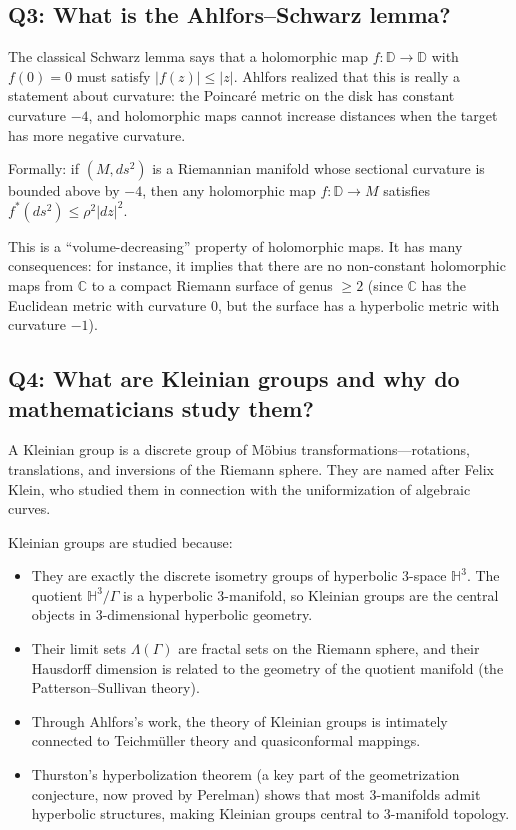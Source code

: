 \subsection*{Q3: What is the Ahlfors--Schwarz lemma?}

The classical Schwarz lemma says that a holomorphic map $f: \mathbb{D} \to \mathbb{D}$ with $f(0)=0$ must satisfy $|f(z)| \leq |z|$. Ahlfors realized that this is really a statement about curvature: the Poincar{\'e} metric on the disk has constant curvature $-4$, and holomorphic maps cannot increase distances when the target has more negative curvature.

Formally: if $(M, ds^2)$ is a Riemannian manifold whose sectional curvature is bounded above by $-4$, then any holomorphic map $f: \mathbb{D} \to M$ satisfies $f^*(ds^2) \leq \rho^2|dz|^2$.

This is a ``volume-decreasing'' property of holomorphic maps. It has many consequences: for instance, it implies that there are no non-constant holomorphic maps from $\mathbb{C}$ to a compact Riemann surface of genus $\geq 2$ (since $\mathbb{C}$ has the Euclidean metric with curvature $0$, but the surface has a hyperbolic metric with curvature $-1$).

\subsection*{Q4: What are Kleinian groups and why do mathematicians study them?}

A Kleinian group is a discrete group of M\"{o}bius transformations---rotations, translations, and inversions of the Riemann sphere. They are named after Felix Klein, who studied them in connection with the uniformization of algebraic curves.

Kleinian groups are studied because:
\begin{itemize}
    \item They are exactly the discrete isometry groups of hyperbolic 3-space $\mathbb{H}^3$. The quotient $\mathbb{H}^3/\Gamma$ is a hyperbolic 3-manifold, so Kleinian groups are the central objects in 3-dimensional hyperbolic geometry.
    \item Their limit sets $\Lambda(\Gamma)$ are fractal sets on the Riemann sphere, and their Hausdorff dimension is related to the geometry of the quotient manifold (the Patterson--Sullivan theory).
    \item Through Ahlfors's work, the theory of Kleinian groups is intimately connected to Teichm{\"u}ller theory and quasiconformal mappings.
    \item Thurston's hyperbolization theorem (a key part of the geometrization conjecture, now proved by Perelman) shows that most 3-manifolds admit hyperbolic structures, making Kleinian groups central to 3-manifold topology.
\end{itemize}

